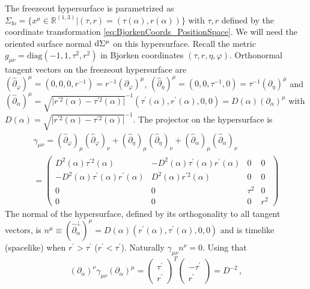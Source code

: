 The freezeout hypersurface is parametrized as $\Sigma_{\text{fo}}=\{x^\mu\in\mathbb{R}^{(1,3)}\vert (\tau,r)=(\tau(\alpha),r(\alpha))\}$ with $\tau,r$ defined by the coordinate transformation \eqref{eq:BjorkenCoords_PositionSpace}. We will need the oriented surface normal $\text{d}\Sigma^\mu$ on this hypersurface. Recall the metric ${g_{\mu\nu}=\text{diag}(-1,1,\tau^2,r^2)}$ in Bjorken coordinates $(\tau,r,\eta,\varphi)$. Orthonormal tangent vectors on the freezeout hypersurface are ${(\hat\partial_\varphi)^\mu=(0,0,0,r^{-1})=r^{-1}(\partial_\varphi)^\mu}$, ${(\hat\partial_\eta)^\mu=(0,0,\tau^{-1},0)=\tau^{-1}(\partial_\eta)^\mu}$ and ${(\hat\partial_\alpha)^\mu=\sqrt{\vert r^{\prime 2}(\alpha)-\tau^{\prime 2}(\alpha)\vert}^{-1}(\tau^{\prime}(\alpha),r^{\prime}(\alpha),0,0)=D(\alpha)(\partial_\alpha)^\mu}$ with ${D(\alpha)=\sqrt{\vert r^{\prime 2}(\alpha)-\tau^{\prime 2}(\alpha)\vert}^{-1}}$. The projector on the hypersurface is
    \begin{multline}
        \gamma_{\mu\nu}=(\hat\partial_\varphi)_\mu(\hat\partial_\varphi)_\nu+(\hat\partial_\eta)_\mu(\hat\partial_\eta)_\nu+(\hat\partial_\alpha)_\mu(\hat\partial_\alpha)_\nu\\
        =\begin{pmatrix}
            D^2(\alpha)\tau^{\prime2}(\alpha)               & -D^2(\alpha)\tau^\prime(\alpha)r^\prime(\alpha) & 0      & 0   \\
            -D^2(\alpha)\tau^\prime(\alpha)r^\prime(\alpha) & D^2(\alpha)r^{\prime2}(\alpha)                  & 0      & 0   \\
            0                                               & 0                                               & \tau^2 & 0   \\
            0                                               & 0                                               & 0      & r^2
        \end{pmatrix}
    \end{multline}
The normal of the hypersurface, defined by its orthogonality to all tangent vectors, is ${n^\mu\equiv(\hat\partial_\alpha^\perp)^\mu=D(\alpha)(r^\prime(\alpha),\tau^\prime(\alpha),0,0)}$ and is timelike (spacelike) when ${r^\prime>\tau^\prime}$ (${r^\prime<\tau^\prime}$). Naturally ${\gamma_{\mu\nu}n^\nu=0}$. Using that
    \begin{equation}
        (\partial_\alpha)^\nu\gamma_{\mu\nu}(\partial_\alpha)^\mu=\begin{pmatrix}
            \tau^\prime \\r^\prime
        \end{pmatrix}^T\begin{pmatrix}
            -\tau^\prime \\
            r^\prime
        \end{pmatrix}=D^{-2}\,,
    \end{equation}
